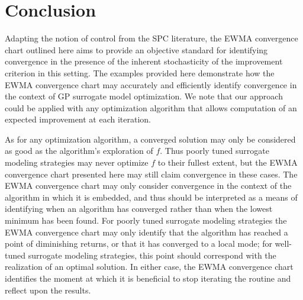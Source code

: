 \documentclass[12pt]{article}
\begin{document}
%
%
\section{Conclusion}
%
%

%
Adapting the notion of control from the SPC literature, the EWMA convergence chart outlined here aims to provide an objective standard for identifying convergence in the presence of the inherent stochasticity of the improvement criterion in this setting. %
%
The examples provided here demonstrate how the EWMA convergence chart may accurately and efficiently identify convergence in the context of GP surrogate model optimization. 
%
We note that our approach could be applied with any optimization algorithm that allows computation of an expected improvement at each iteration.

%
%

As for any optimization algorithm, a converged solution may only be considered as good as the algorithm's exploration of $f$. 
%
Thus poorly tuned surrogate modeling strategies may never optimize $f$ to their fullest extent, but the EWMA convergence chart presented here may still claim convergence in these cases. %
%
The EWMA convergence chart may only consider convergence in the context of the algorithm in which it is embedded, and thus should be interpreted as a means of identifying when an algorithm has converged rather than when the lowest minimum has been found. %
%
For poorly tuned surrogate modeling strategies the EWMA convergence chart may only identify that the algorithm has reached a point of diminishing returns, or that it has converged to a local mode; for well-tuned surrogate modeling strategies, this point should correspond with the realization of an optimal solution. 
%
In either case, the EWMA convergence chart identifies the moment at which it is beneficial to stop iterating the routine and reflect upon the results.

%
%

\end{document}
